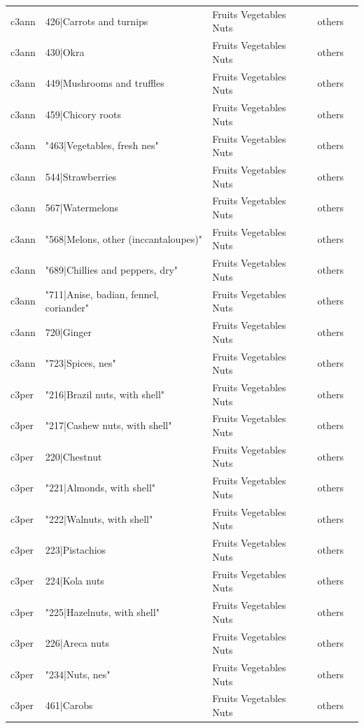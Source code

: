 \documentclass[gc, manuscript]{copernicus}
\begin{document}
\begin{table}[htbp]
\begin{tabular}{lllll}
      c3ann & 426|Carrots and turnips & Fruits Vegetables Nuts & others \\ 
      c3ann & 430|Okra & Fruits Vegetables Nuts & others \\ 
      c3ann & 449|Mushrooms and truffles & Fruits Vegetables Nuts & others \\ 
      c3ann & 459|Chicory roots & Fruits Vegetables Nuts & others \\ 
      c3ann & "463|Vegetables, fresh nes" & Fruits Vegetables Nuts & others \\ 
      c3ann & 544|Strawberries & Fruits Vegetables Nuts & others \\ 
      c3ann & 567|Watermelons & Fruits Vegetables Nuts & others \\ 
      c3ann & "568|Melons, other (inccantaloupes)" & Fruits Vegetables Nuts & others \\ 
      c3ann & "689|Chillies and peppers, dry" & Fruits Vegetables Nuts & others \\ 
      c3ann & "711|Anise, badian, fennel, coriander" & Fruits Vegetables Nuts & others \\ 
      c3ann & 720|Ginger & Fruits Vegetables Nuts & others \\ 
      c3ann & "723|Spices, nes" & Fruits Vegetables Nuts & others \\ 
      c3per & "216|Brazil nuts, with shell" & Fruits Vegetables Nuts & others \\ 
      c3per & "217|Cashew nuts, with shell" & Fruits Vegetables Nuts & others \\ 
      c3per & 220|Chestnut & Fruits Vegetables Nuts & others \\ 
      c3per & "221|Almonds, with shell" & Fruits Vegetables Nuts & others \\ 
      c3per & "222|Walnuts, with shell" & Fruits Vegetables Nuts & others \\ 
      c3per & 223|Pistachios & Fruits Vegetables Nuts & others \\ 
      c3per & 224|Kola nuts & Fruits Vegetables Nuts & others \\ 
      c3per & "225|Hazelnuts, with shell" & Fruits Vegetables Nuts & others \\ 
      c3per & 226|Areca nuts & Fruits Vegetables Nuts & others \\ 
      c3per & "234|Nuts, nes" & Fruits Vegetables Nuts & others \\ 
      c3per & 461|Carobs & Fruits Vegetables Nuts & others \\ 

\end{tabular}
\end{table}
\end{document}
